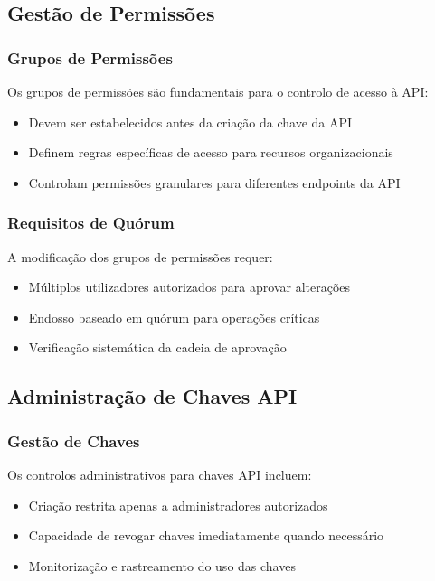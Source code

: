\subsection{Gestão de Permissões}
\subsubsection{Grupos de Permissões}
Os grupos de permissões são fundamentais para o controlo de acesso à API:
\begin{itemize}
\item Devem ser estabelecidos antes da criação da chave da API
\item Definem regras específicas de acesso para recursos organizacionais
\item Controlam permissões granulares para diferentes endpoints da API
\end{itemize}

\subsubsection{Requisitos de Quórum}
A modificação dos grupos de permissões requer:
\begin{itemize}
\item Múltiplos utilizadores autorizados para aprovar alterações
\item Endosso baseado em quórum para operações críticas
\item Verificação sistemática da cadeia de aprovação
\end{itemize}

\subsection{Administração de Chaves API}
\subsubsection{Gestão de Chaves}
Os controlos administrativos para chaves API incluem:
\begin{itemize}
\item Criação restrita apenas a administradores autorizados
\item Capacidade de revogar chaves imediatamente quando necessário
\item Monitorização e rastreamento do uso das chaves
\end{itemize}

